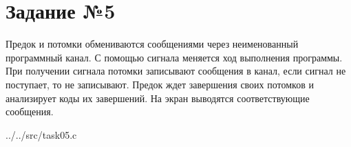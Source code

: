 \section*{Задание №5}

Предок и потомки обмениваются сообщениями через неименованный программный
канал. С помощью сигнала меняется ход выполнения программы. При получении
сигнала потомки записывают сообщения в канал, если сигнал не поступает, то не
записывают. Предок ждет завершения своих потомков и анализирует коды их
завершений. На экран выводятся соответствующие сообщения.

\begin{lstinputlisting}[
    caption={Системный вызов signal()},
    label={lst:signal}
]{../../src/task05.c}
\end{lstinputlisting}

~\\
~\\
~\\
~\\
~\\
~\\
~\\
~\\
~\\
~\\
~\\
~\\
